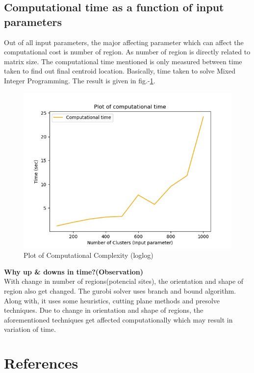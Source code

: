 \documentclass[preprint,12pt]{elsarticle}
\begin{document}
\subsection{Computational time as a function of input parameters}
Out of all input parameters, the major affecting parameter which can affect the computational cost is number of region. As number of region is directly related to matrix size. The computational time mentioned is only measured between time taken to find out final centroid location. Basically, time taken to solve Mixed Integer Programming. The result is given in fig.-\ref{fig:time}.

\begin{figure}[H]
	\centering  
	\includegraphics[width=0.8\linewidth]{./time.jpg}
	\vspace{2mm}
	\caption{Plot of Computational Complexity (loglog)}
	\label{fig:time}
\end{figure}

\textbf{ Why up \& downs in time?(Observation)} \\
 With change in number of regions(potencial sites), the orientation and shape of region also get changed. The gurobi solver uses branch and bound algorithm. Along with, it uses some heuristics, cutting plane methods and presolve techniques\cite{gurobiSol}. Due to change in orientation and shape of regions, the aforementioned techniques get affected computationally which may result in variation of time.



	\newpage
	
\section{References}
	
\end{document}
